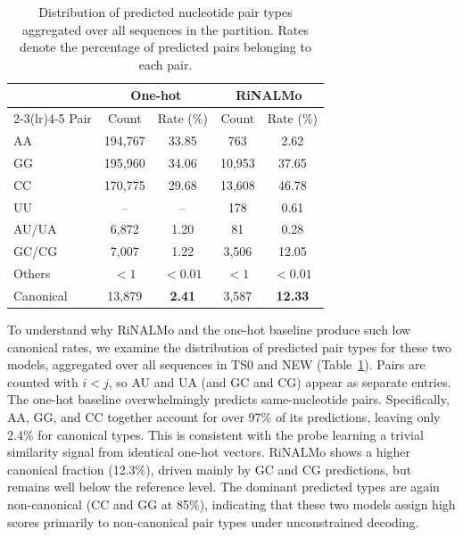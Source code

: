 \documentclass[logo,bsc,singlespacing,parskip]{infthesis}
\begin{document}
\begin{table}[t]
\centering
\small
\caption{
Distribution of predicted nucleotide pair types aggregated over all sequences in the partition.
Rates denote the percentage of predicted pairs belonging to each pair.
}
\label{tab:pair_distribution}
\setlength{\tabcolsep}{6pt}
\begin{tabular}{lcccc}
\toprule
& \multicolumn{2}{c}{One-hot} & \multicolumn{2}{c}{RiNALMo} \\
\cmidrule(lr){2-3}\cmidrule(lr){4-5}
Pair & Count & Rate (\%) & Count & Rate (\%) \\
\midrule
AA    & 194{,}767 & 33.85 & 763    & 2.62 \\
GG    & 195{,}960 & 34.06 & 10{,}953 & 37.65 \\
CC    & 170{,}775 & 29.68 & 13{,}608 & 46.78 \\
UU    & --        & --    & 178    & 0.61 \\
AU/UA & 6{,}872   & 1.20  & 81     & 0.28 \\
GC/CG & 7{,}007   & 1.22  & 3{,}506 & 12.05 \\
Others & $<1$     & $<0.01$ & $<1$ & $<0.01$ \\
\midrule
Canonical & 13{,}879 & \textbf{2.41} & 3{,}587 & \textbf{12.33} \\
\bottomrule
\end{tabular}
\end{table}

To understand why RiNALMo and the one-hot baseline produce such low
canonical rates, we examine the distribution of predicted pair types
for these two models, aggregated over all sequences in TS0 and NEW
(Table~\ref{tab:pair_distribution}). Pairs are counted with $i < j$,
so AU and UA (and GC and CG) appear as separate entries. The one-hot baseline overwhelmingly predicts same-nucleotide pairs.
Specifically, AA, GG, and CC together account for over 97\% of its predictions,
leaving only 2.4\% for canonical types. This is consistent with the
probe learning a trivial similarity signal from identical one-hot
vectors. RiNALMo shows a higher canonical fraction (12.3\%), driven
mainly by GC and CG predictions, but remains well below the reference
level. The dominant predicted types are again non-canonical (CC and GG at 85\%), indicating that these two models assign high
scores primarily to non-canonical pair types under unconstrained decoding.

\end{document}
